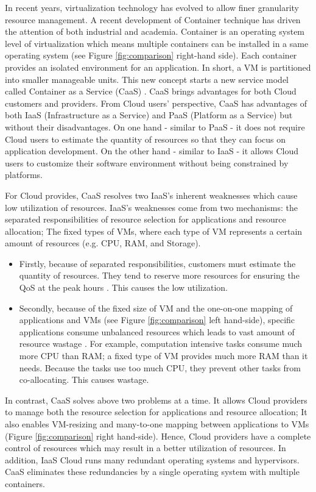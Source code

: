 In recent years, virtualization technology has evolved to allow finer granularity resource management.
A recent development of Container technique \cite{Soltesz:2007cu} has driven the attention of both industrial and academia.
Container is an operating system level of virtualization which means multiple containers can be installed in a same operating system (see Figure \ref{fig:comparison} right-hand side). Each container provides an isolated environment for an application. In short, a VM is partitioned into smaller manageable units.
This new concept starts a new service model called Container as a Service (CaaS) \cite{Piraghaj:2015uf}. CaaS brings advantages for both Cloud customers and providers.
From Cloud users' perspective, CaaS has advantages of both IaaS (Infrastructure as a Service) and PaaS (Platform as a Service) but without their disadvantages. On one hand - similar to PaaS - it does not require Cloud users to estimate the quantity of resources so that they can focus on application development. On the other hand - similar to IaaS - it allows Cloud users to customize their software environment without being constrained by platforms. 

For Cloud provides, CaaS resolves two IaaS's inherent weaknesses which cause low utilization of resources.
IaaS's weaknesses come from two mechanisms: the separated responsibilities of resource selection for applications and resource allocation; The fixed types of VMs, where each type of VM represents a certain amount of resources (e.g. CPU, RAM, and Storage). 
\begin{itemize}
	\item Firstly, because of separated responsibilities, customers must estimate the quantity of resources. They tend to reserve more resources for ensuring the QoS at the peak hours \cite{Chaisiri:2012cv}. This causes the low utilization.
	\item Secondly, because of the fixed size of VM and the one-on-one mapping of applications and VMs (see Figure \ref{fig:comparison} left hand-side), specific applications consume unbalanced resources which leads to vast amount of resource wastage \cite{Tomas:2013iv}. For example, computation intensive tasks consume much more CPU than RAM; a fixed type of VM provides much more RAM than it needs. Because the tasks use too much CPU, they prevent other tasks from co-allocating.
	This causes wastage.
\end{itemize}

In contrast, CaaS solves above two problems at a time. It allows Cloud providers to manage both the resource selection for applications and resource allocation; It also enables VM-resizing and many-to-one mapping between applications to VMs (Figure \ref{fig:comparison} right hand-side).
Hence, Cloud providers have a complete control of resources which may result in a better utilization of resources. 
In addition, IaaS Cloud runs many redundant operating systems and hypervisors. CaaS eliminates these redundancies by a single operating system with multiple containers.

